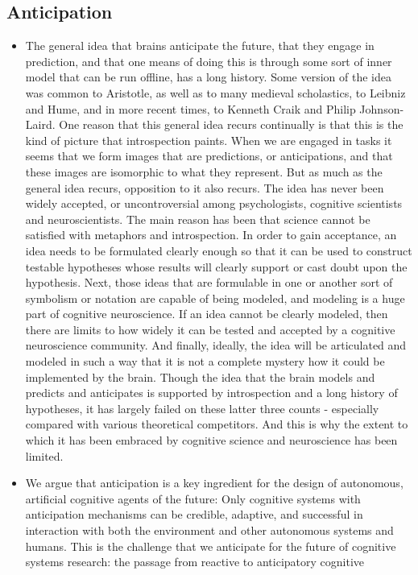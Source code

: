 \documentclass[]{usiinfdocprop}
\begin{document}
\subsection{Anticipation}
\begin{itemize}

    \item \citep[Introduction]{Pezzulo2014}The general idea that brains anticipate the future, that they engage in prediction, and that one means of doing this is through some sort of inner model that can be run offline, has a long history. Some version of the idea was common to Aristotle, as well as to many medieval scholastics, to Leibniz and Hume, and in more recent times, to Kenneth Craik and Philip Johnson-Laird. One reason that this general idea recurs continually is that this is the kind of picture that introspection paints. When we are engaged in tasks it seems that we form images that are predictions, or anticipations, and that these images are isomorphic to what they represent. But as much as the general idea recurs, opposition to it also recurs. The idea has never been widely accepted, or uncontroversial among psychologists, cognitive scientists and neuroscientists. The main reason has been that science cannot be satisfied with metaphors and introspection. In order to gain acceptance, an idea needs to be formulated clearly enough so that it can be used to construct testable hypotheses whose results will clearly support or cast doubt upon the hypothesis. Next, those ideas that are formulable in one or another sort of symbolism or notation are capable of being modeled, and modeling is a huge part of cognitive neuroscience. If an idea cannot be clearly modeled, then there are limits to how widely it can be tested and accepted by a cognitive neuroscience community. And finally, ideally, the idea will be articulated and modeled in such a way that it is not a complete mystery how it could be implemented by the brain. Though the idea that the brain models and predicts and anticipates is supported by introspection and a long history of hypotheses, it has largely failed on these latter three counts - especially compared with various theoretical competitors. And this is why the extent to which it has been embraced by cognitive science and neuroscience has been limited. 

    \item \citep[Chapter 1.1]{Pezzulo2014} We argue that anticipation is a key ingredient for the design of autonomous, artificial cognitive agents of the future: Only cognitive systems with anticipation mechanisms can be credible, adaptive, and successful in interaction with both the environment and other autonomous systems and humans. This is the challenge that we anticipate for the future of cognitive systems research: the passage from reactive to anticipatory cognitive
    

\end{itemize}
\end{document}
